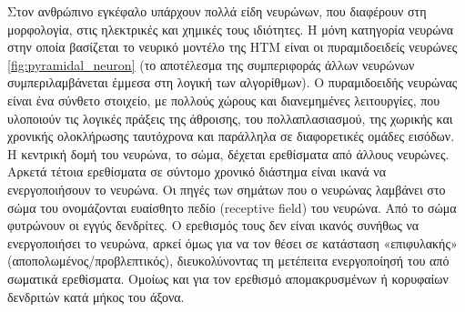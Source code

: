 	Στον ανθρώπινο εγκέφαλο υπάρχουν πολλά είδη νευρώνων, που διαφέρουν στη μορφολογία, στις ηλεκτρικές και χημικές τους ιδιότητες.
	Η μόνη κατηγορία νευρώνα στην οποία βασίζεται το νευρικό μοντέλο της HTM είναι οι πυραμιδοειδείς νευρώνες \ref{fig:pyramidal_neuron}
	(το αποτέλεσμα της συμπεριφοράς άλλων νευρώνων συμπεριλαμβάνεται έμμεσα στη λογική των αλγορίθμων).
	Ο πυραμιδοειδής νευρώνας είναι ένα σύνθετο στοιχείο, με πολλούς χώρους και διανεμημένες λειτουργίες, που υλοποιούν τις λογικές πράξεις της άθροισης,
	του πολλαπλασιασμού, της χωρικής και χρονικής ολοκλήρωσης ταυτόχρονα και παράλληλα σε διαφορετικές ομάδες εισόδων.
	Η κεντρική δομή του νευρώνα, το σώμα, δέχεται ερεθίσματα από άλλους νευρώνες.
	Αρκετά τέτοια ερεθίσματα σε σύντομο χρονικό διάστημα είναι ικανά να ενεργοποιήσουν το νευρώνα.
	Οι πηγές των σημάτων που ο νευρώνας λαμβάνει στο σώμα του ονομάζονται ευαίσθητο πεδίο (receptive field) του νευρώνα.
	Από το σώμα φυτρώνουν οι εγγύς δενδρίτες. Ο ερεθισμός τους δεν είναι ικανός συνήθως να ενεργοποιήσει το νευρώνα, αρκεί όμως για να τον θέσει
	σε κατάσταση «επιφυλακής» (αποπολωμένος/προβλεπτικός), διευκολύνοντας τη μετέπειτα ενεργοποίησή του από σωματικά ερεθίσματα.
	Ομοίως και για τον ερεθισμό απομακρυσμένων ή κορυφαίων δενδριτών κατά μήκος του άξονα.

